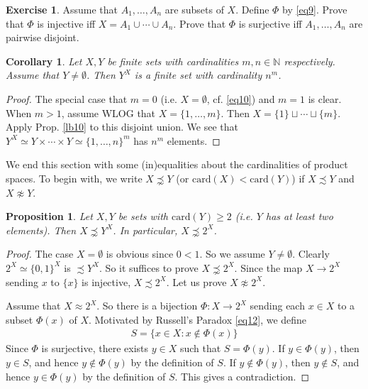 \documentclass[12pt,b5paper,notitlepage]{article}
\theoremstyle{definition}
\newtheorem{exe}[df]{Exercise}
\theoremstyle{plain}
\newtheorem{pp}[df]{Proposition}
\newtheorem{co}[df]{Corollary}
\newcommand{\Nbb}{\mathbb N}
\newcommand{\card}{\mathrm{card}}
\numberwithin{equation}{section}
\begin{document}
\begin{exe}
Assume that $A_1,\dots,A_n$ are subsets of $X$. Define $\Phi$ by \eqref{eq9}. Prove that $\Phi$ is injective iff $X=A_1\cup\cdots\cup A_n$. Prove that $\Phi$ is surjective iff $A_1,\dots, A_n$ are pairwise disjoint. 
\end{exe}

\begin{co}\label{lb12}
Let $X,Y$ be finite sets with cardinalities $m,n\in\Nbb$ respectively. Assume that $Y\neq\emptyset$. Then $Y^X$ is a finite set with cardinality $n^m$.
\end{co}

\begin{proof}
The special case that $m=0$ (i.e. $X=\emptyset$, cf. \eqref{eq10}) and $m=1$ is clear. When $m>1$, assume WLOG that $X=\{1,\dots,m\}$. Then $X=\{1\}\sqcup\cdots\sqcup\{m\}$. Apply Prop. \ref{lb10} to this disjoint union. We see that $Y^X\simeq Y\times \cdots\times Y\simeq\{1,\dots,n\}^m$ has $n^m$ elements.
\end{proof}



We end this section with some (in)equalities about the cardinalities of product spaces. To begin with, we write $X\precnsim Y$ (or $\card(X)<\card(Y)$) if $X\precsim Y$ and $X\napprox Y$.

\begin{pp}\label{lb14}
Let $X,Y$ be sets with $\card(Y)\geq 2$ (i.e. $Y$ has at least two elements). Then $X\precnsim Y^X$. In particular, $X\precnsim 2^X$.
\end{pp}

\begin{proof}
The case $X=\emptyset$ is obvious since $0<1$. So we assume $Y\neq\emptyset$. Clearly $2^X\simeq\{0,1\}^X$ is $\precsim Y^X$. So it suffices to prove $X\precnsim 2^X$. Since the map $X\rightarrow 2^X$ sending $x$ to $\{x\}$ is injective, $X\precsim 2^X$. Let us prove $X\napprox 2^X$.

Assume that $X\approx 2^X$. So there is a bijection $\Phi:X\rightarrow 2^X$ sending each $x\in X$ to a subset $\Phi(x)$ of $X$. Motivated by Russell's Paradox \eqref{eq12}, we define
\begin{align*}
S=\{x\in X:x\notin \Phi(x)\}
\end{align*}
Since $\Phi$ is surjective, there exists $y\in X$ such that $S=\Phi(y)$. If $y\in\Phi(y)$, then $y\in S$, and hence $y\notin \Phi(y)$ by the definition of $S$. If $y\notin\Phi(y)$, then $y\notin S$, and hence $y\in\Phi(y)$ by the definition of $S$. This gives a contradiction.
\end{proof}
\end{document}
